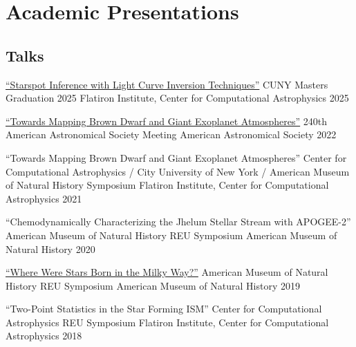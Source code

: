 \section{Academic Presentations}

\subsection*{Talks}

\begin{presentation}
{\href{https://www.youtube.com/watch?v=Ek3ERhEmccQ}{``Starspot Inference with Light Curve Inversion Techniques''}}
{CUNY Masters Graduation 2025}
{Flatiron Institute, Center for Computational Astrophysics}
{2025}
\end{presentation}

\begin{presentation}
{\href{https://ui.adsabs.harvard.edu/abs/2022AAS...24021703R/abstract}{``Towards Mapping Brown Dwarf and Giant Exoplanet Atmospheres''}}
{240th American Astronomical Society Meeting}
{American Astronomical Society}
{2022}
\end{presentation}

\begin{presentation}
{``Towards Mapping Brown Dwarf and Giant Exoplanet Atmospheres''}
{Center for Computational Astrophysics / City University of New York / American Museum of Natural History Symposium}
{Flatiron Institute, Center for Computational Astrophysics}
{2021}
\end{presentation}

\begin{presentation}
{``Chemodynamically Characterizing the Jhelum Stellar Stream with APOGEE-2''}
{American Museum of Natural History REU Symposium}
{American Museum of Natural History}
{2020}
\end{presentation}

\begin{presentation}
{\href{https://youtu.be/mUFHpJObnoQ}{``Where Were Stars Born in the Milky Way?''}}
{American Museum of Natural History REU Symposium}
{American Museum of Natural History}
{2019}
\end{presentation}

\begin{presentation}
{``Two-Point Statistics in the Star Forming ISM''}
{Center for Computational Astrophysics REU Symposium}
{Flatiron Institute, Center for Computational Astrophysics}
{2018}
\end{presentation}

